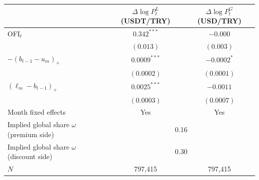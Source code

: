 \begin{tabular}{lcc}
\toprule
 & $\Delta\log P^L_t$ (USDT/TRY) & $\Delta\log P^G_t$ (USD/TRY) \\
\midrule
OFI$_t$ & $0.342^{***}$ & $-0.000$ \\
 & $(0.013)$ & $(0.003)$ \\
$-(b_{t-1}-u_m)_+$ & $0.0009^{***}$ & $-0.0002^{*}$ \\
 & $(0.0002)$ & $(0.0001)$ \\
$(\ell_m-b_{t-1})_+$ & $0.0025^{***}$ & $-0.0011$ \\
 & $(0.0003)$ & $(0.0007)$ \\
\midrule
Month fixed effects & Yes & Yes \\
Implied global share $\omega$ (premium side) & \multicolumn{2}{c}{0.16} \\
Implied global share $\omega$ (discount side) & \multicolumn{2}{c}{0.30} \\
$N$ & 797,415 & 797,415 \\
\bottomrule
\end{tabular}
